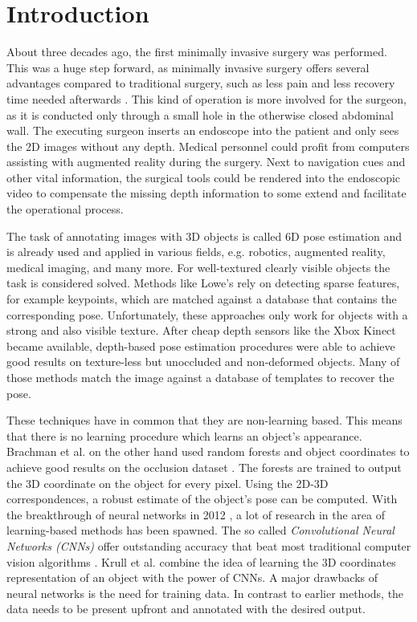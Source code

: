 \chapter{Introduction}

About three decades ago, the first minimally invasive surgery was performed. This was a huge step forward, as minimally invasive surgery offers several advantages compared to traditional surgery, such as less pain and less recovery time needed afterwards \cite{minimallyinvasive}. This kind of operation is more involved for the surgeon, as it is conducted only through a small hole in the otherwise closed abdominal wall. The executing surgeon inserts an endoscope into the patient and only sees the 2D images without any depth. Medical personnel could profit from computers assisting with augmented reality during the surgery. Next to navigation cues and other vital information, the surgical tools could be rendered into the  endoscopic video to compensate the missing depth information to some extend and facilitate the operational process. \

The task of annotating images with 3D objects is called 6D pose estimation and is already used and applied in various fields, e.g. robotics, augmented reality, medical imaging, and many more. For well-textured clearly visible objects the task is considered solved. Methods like Lowe's \cite{dglowe1} rely on detecting sparse features, for example keypoints, which are matched against a database that contains the corresponding pose.
Unfortunately, these approaches only work for objects with a strong and also visible texture. After cheap depth sensors like the Xbox Kinect became available, depth-based pose estimation procedures were able to achieve good results on texture-less but unoccluded and non-deformed objects. Many of those methods match the image against a database of templates to recover the pose. \

These techniques have in common that they are non-learning based. This means that there is no learning procedure which learns an object's appearance. Brachman et al. on the other hand used random forests and object coordinates to achieve good results on the occlusion dataset \cite{brachmann1}. The forests are trained to output the 3D coordinate on the object for every pixel. Using the 2D-3D correspondences, a robust estimate of the object's pose can be computed. With the breakthrough of neural networks in 2012 \cite{imagenet}, a lot of research in the area of learning-based methods has been spawned. The so called \textit{Convolutional Neural Networks (CNNs)} offer outstanding accuracy that beat most traditional computer vision algorithms \cite{ylecun}. Krull et al. \cite{akrull} combine the idea of learning the 3D coordinates representation of an object with the power of CNNs. A major drawbacks of neural networks is the need for training data. In contrast to earlier methods, the data needs to be present upfront and annotated with the desired output. \

